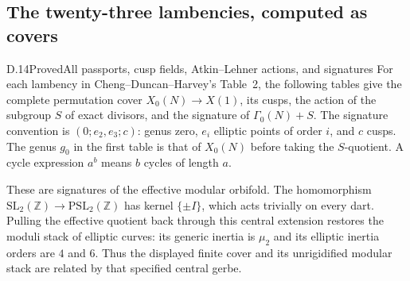 \subsection{The twenty-three lambencies, computed as covers}

\begin{result}{D.14}{Proved}{All passports, cusp fields, Atkin--Lehner actions, and signatures}
For each lambency in Cheng--Duncan--Harvey's Table~2, the following tables give the complete permutation cover $X_0(N)\to X(1)$, its cusps, the action of the subgroup $S$ of exact divisors, and the signature of $\Gamma_0(N)+S$. The signature convention is $(0;e_2,e_3;c)$: genus zero, $e_i$ elliptic points of order $i$, and $c$ cusps. The genus $g_0$ in the first table is that of $X_0(N)$ before taking the $S$-quotient. A cycle expression $a^b$ means $b$ cycles of length $a$.

These are signatures of the effective modular orbifold. The homomorphism $\mathrm{SL}_2(\mathbb Z)\to\mathrm{PSL}_2(\mathbb Z)$ has kernel $\{\pm I\}$, which acts trivially on every dart. Pulling the effective quotient back through this central extension restores the moduli stack of elliptic curves: its generic inertia is $\mu_2$ and its elliptic inertia orders are $4$ and $6$. Thus the displayed finite cover and its unrigidified modular stack are related by that specified central gerbe.
\end{result}

{\small}

